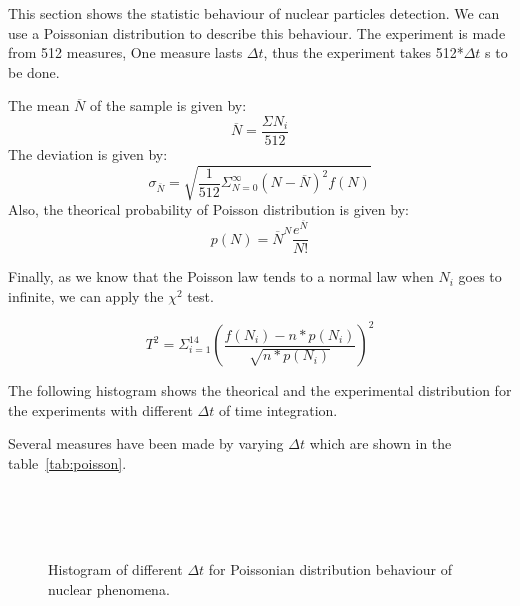 \documentclass[a4paper,12pt,oneside]{article}
\begin{document}
This section shows the statistic behaviour of nuclear particles detection. We can use a Poissonian distribution to describe this behaviour.
The experiment is made from 512 measures, One measure lasts $\Delta t$, thus the experiment takes 512*$\Delta t$ s to be done.

The mean $\overline{N}$ of the sample is given by: $$\overline{N}=\frac{\Sigma N_i}{512}$$
The deviation is given by: $$\sigma_{\overline{N}}=\sqrt{\frac{1}{512}\Sigma^{\infty}_{N=0} (N-\overline{N})^2 f(N)}$$
Also, the theorical probability of Poisson distribution is given by: $$p(N)=\overline{N}^N \frac{e^{\overline{N}}}{N!}$$

Finally, as we know that the Poisson law tends to a normal law when $N_i$ goes to infinite, we can apply the $\chi^2$ test.

$$T^2=\Sigma^{14}_{i=1}{\left(\frac{f(N_i)-n*p(N_i)}{\sqrt{n*p(N_i)}}\right)^2}$$

The following histogram shows the theorical and the experimental distribution for the experiments with different $\Delta t$ of time integration.

Several measures have been made by varying $\Delta t$ which are shown in the table~\ref{tab:poisson}.

\begin{figure}[h!]
  \centering

  \\
  \\
  \\
  \label{figur}\caption{Histogram of different $\Delta t$ for Poissonian distribution behaviour of nuclear phenomena.}
\end{figure}
\end{document}
